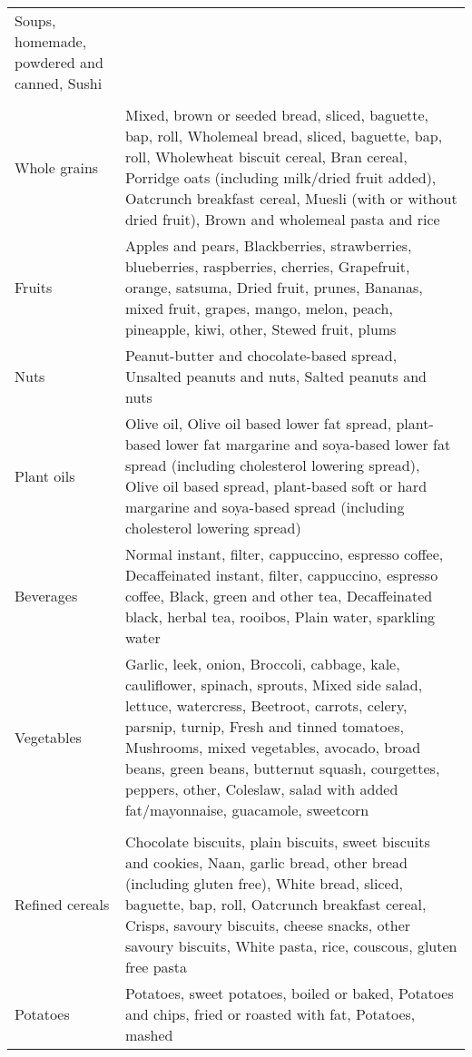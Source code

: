 \begin{longtable}{@{\extracolsep{\fill}}>{\raggedright\arraybackslash}p{}>{\raggedright\arraybackslash}p{}}
  Soups, homemade, powdered and canned, Sushi \\ 
{\bfseries Healthy plant-based foods} &   \\ 
Whole grains & Mixed, brown or seeded bread, sliced, baguette, bap, roll, Wholemeal bread, sliced, baguette, bap, roll,
  Wholewheat biscuit cereal, Bran cereal, Porridge oats (including milk/dried fruit added),
  Oatcrunch breakfast cereal, Muesli (with or without dried fruit), Brown and wholemeal pasta and rice \\ 
Fruits & Apples and pears, Blackberries, strawberries, blueberries, raspberries, cherries, Grapefruit, orange, satsuma,
  Dried fruit, prunes, Bananas, mixed fruit, grapes, mango, melon, peach, pineapple, kiwi, other, Stewed fruit, plums \\ 
Nuts & Peanut-butter and chocolate-based spread, Unsalted peanuts and nuts, Salted peanuts and nuts \\ 
Plant oils & Olive oil, Olive oil based lower fat spread, plant-based lower fat margarine and soya-based lower fat spread (including cholesterol lowering spread),
  Olive oil based spread, plant-based soft or hard margarine and soya-based spread (including cholesterol lowering spread) \\ 
Beverages & Normal instant, filter, cappuccino, espresso coffee, Decaffeinated instant, filter, cappuccino, espresso coffee,
  Black, green and other tea, Decaffeinated black, herbal tea, rooibos, Plain water, sparkling water \\ 
Vegetables & Garlic, leek, onion, Broccoli, cabbage, kale, cauliflower, spinach, sprouts, Mixed side salad, lettuce, watercress,
  Beetroot, carrots, celery, parsnip, turnip, Fresh and tinned tomatoes,
  Mushrooms, mixed vegetables, avocado, broad beans, green beans, butternut squash, courgettes, peppers, other,
  Coleslaw, salad with added fat/mayonnaise, guacamole, sweetcorn \\ 
{\bfseries Unhealthy plant-based foods} &   \\ 
Refined cereals & Chocolate biscuits, plain biscuits, sweet biscuits and cookies, Naan, garlic bread, other bread (including gluten free),
  White bread, sliced, baguette, bap, roll, Oatcrunch breakfast cereal, Crisps, savoury biscuits, cheese snacks, other savoury biscuits,
  White pasta, rice, couscous, gluten free pasta \\ 
Potatoes & Potatoes, sweet potatoes, boiled or baked, Potatoes and chips, fried or roasted with fat, Potatoes, mashed \\ 

\end{longtable}
